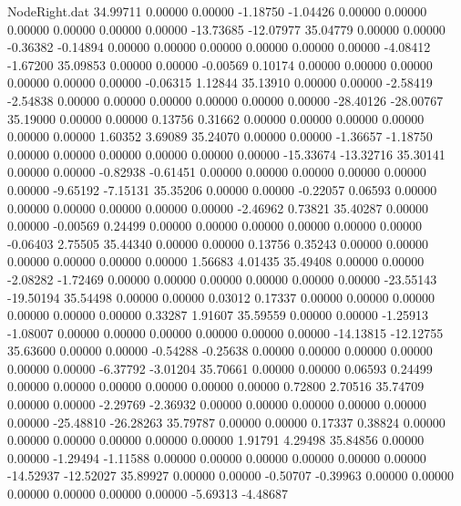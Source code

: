 \begin{filecontents}{NodeRight.dat}
  34.99711    0.00000    0.00000    -1.18750   -1.04426    0.00000    0.00000    0.00000    0.00000    0.00000    0.00000  -13.73685  -12.07977
  35.04779    0.00000    0.00000    -0.36382   -0.14894    0.00000    0.00000    0.00000    0.00000    0.00000    0.00000   -4.08412   -1.67200
  35.09853    0.00000    0.00000    -0.00569    0.10174    0.00000    0.00000    0.00000    0.00000    0.00000    0.00000   -0.06315    1.12844
  35.13910    0.00000    0.00000    -2.58419   -2.54838    0.00000    0.00000    0.00000    0.00000    0.00000    0.00000  -28.40126  -28.00767
  35.19000    0.00000    0.00000     0.13756    0.31662    0.00000    0.00000    0.00000    0.00000    0.00000    0.00000    1.60352    3.69089
  35.24070    0.00000    0.00000    -1.36657   -1.18750    0.00000    0.00000    0.00000    0.00000    0.00000    0.00000  -15.33674  -13.32716
  35.30141    0.00000    0.00000    -0.82938   -0.61451    0.00000    0.00000    0.00000    0.00000    0.00000    0.00000   -9.65192   -7.15131
  35.35206    0.00000    0.00000    -0.22057    0.06593    0.00000    0.00000    0.00000    0.00000    0.00000    0.00000   -2.46962    0.73821
  35.40287    0.00000    0.00000    -0.00569    0.24499    0.00000    0.00000    0.00000    0.00000    0.00000    0.00000   -0.06403    2.75505
  35.44340    0.00000    0.00000     0.13756    0.35243    0.00000    0.00000    0.00000    0.00000    0.00000    0.00000    1.56683    4.01435
  35.49408    0.00000    0.00000    -2.08282   -1.72469    0.00000    0.00000    0.00000    0.00000    0.00000    0.00000  -23.55143  -19.50194
  35.54498    0.00000    0.00000     0.03012    0.17337    0.00000    0.00000    0.00000    0.00000    0.00000    0.00000    0.33287    1.91607
  35.59559    0.00000    0.00000    -1.25913   -1.08007    0.00000    0.00000    0.00000    0.00000    0.00000    0.00000  -14.13815  -12.12755
  35.63600    0.00000    0.00000    -0.54288   -0.25638    0.00000    0.00000    0.00000    0.00000    0.00000    0.00000   -6.37792   -3.01204
  35.70661    0.00000    0.00000     0.06593    0.24499    0.00000    0.00000    0.00000    0.00000    0.00000    0.00000    0.72800    2.70516
  35.74709    0.00000    0.00000    -2.29769   -2.36932    0.00000    0.00000    0.00000    0.00000    0.00000    0.00000  -25.48810  -26.28263
  35.79787    0.00000    0.00000     0.17337    0.38824    0.00000    0.00000    0.00000    0.00000    0.00000    0.00000    1.91791    4.29498
  35.84856    0.00000    0.00000    -1.29494   -1.11588    0.00000    0.00000    0.00000    0.00000    0.00000    0.00000  -14.52937  -12.52027
  35.89927    0.00000    0.00000    -0.50707   -0.39963    0.00000    0.00000    0.00000    0.00000    0.00000    0.00000   -5.69313   -4.48687

\end{filecontents}
